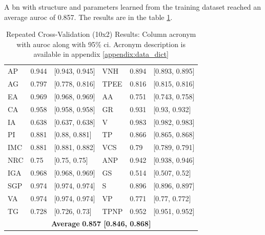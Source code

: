 
A \ac{bn} with structure and parameters learned from the training dataset reached an average \ac{auroc} of 0.857. The results are in the table \ref{tab:result_auc}.



\begin{table}[htpb]
 \caption{Repeated Cross-Validation (10x2) Results: Column acronym with \ac{auroc} along with 95\% \ac{ci}. Acronym description is available in appendix \ref{appendix:data_dict}} \label{tab:result_auc} 

\renewcommand{\arraystretch}{1.2}
\centering
\begin{tabular} { p{1.5cm} p{1.5cm} p{3cm} p{1.5cm} p{1.5cm} l }
\hline
AP & 0.944 & [0.943, 0.945] & VNH & 0.894 & [0.893, 0.895] \\
AG & 0.797 & [0.778, 0.816] & TPEE & 0.816 & [0.815, 0.816] \\
EA & 0.969 & [0.968, 0.969] & AA & 0.751 & [0.743, 0.758] \\
CA & 0.958 & [0.958, 0.958] & GR & 0.931 & [0.93, 0.932] \\
IA & 0.638 & [0.637, 0.638] & V & 0.983 & [0.982, 0.983] \\
PI & 0.881 & [0.88, 0.881] & TP & 0.866 & [0.865, 0.868] \\
IMC & 0.881 & [0.881, 0.882] & VCS & 0.79 & [0.789, 0.791] \\
NRC & 0.75 & [0.75, 0.75] & ANP & 0.942 & [0.938, 0.946] \\
IGA & 0.968 & [0.968, 0.969] & GS & 0.514 & [0.507, 0.52] \\
SGP & 0.974 & [0.974, 0.974] & S & 0.896 & [0.896, 0.897] \\
VA & 0.974 & [0.974, 0.974] & VP & 0.771 & [0.77, 0.772] \\
TG & 0.728 & [0.726, 0.73] & TPNP & 0.952 & [0.951, 0.952] \\
\hline
 \multicolumn{6}{c}{\textbf{Average}  \textbf{0.857 [0.846, 0.868]}} \\

\hline
\end{tabular}
\end{table}


